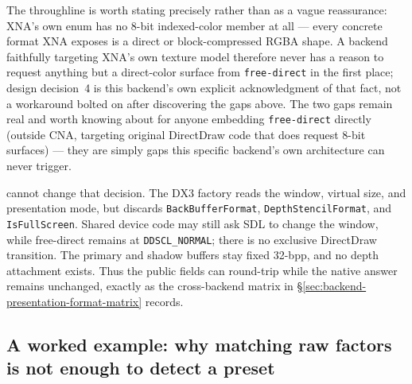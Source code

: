 The throughline is worth stating precisely rather than as a vague reassurance: XNA's own
 enum has no 8-bit indexed-color member at all --- every concrete format
XNA exposes is a direct or block-compressed RGBA shape. A backend faithfully targeting XNA's own
texture model therefore never has a reason to request anything but a direct-color surface from
\texttt{free-direct} in the first place; design decision~4 is this backend's own explicit
acknowledgment of that fact, not a workaround bolted on after discovering the gaps above. The two
gaps remain real and worth knowing about for anyone embedding \texttt{free-direct} directly
(outside CNA, targeting original DirectDraw code that does request 8-bit surfaces) --- they are
simply gaps this specific backend's own architecture can never trigger.

\begin{sourcenote}
 cannot change that decision. The DX3 factory reads the
window, virtual size, and presentation mode, but discards
\texttt{BackBuffer\allowbreak Format}, \texttt{DepthStencil\allowbreak Format}, and
\texttt{IsFull\allowbreak Screen}. Shared device code may still ask SDL to change the window, while
free-direct remains at \texttt{DDSCL\_NORMAL}; there is no exclusive DirectDraw transition.
The primary and shadow buffers stay fixed 32-bpp, and no depth attachment exists. Thus the
public fields can round-trip while the native answer remains unchanged, exactly as the
cross-backend matrix in \S\ref{sec:backend-presentation-format-matrix} records.
\end{sourcenote}

\subsection{A worked example: why matching raw factors is not enough to detect a preset}

